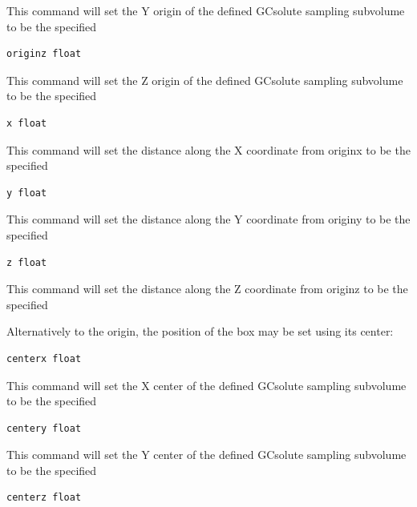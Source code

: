 \documentclass[letterpaper,10pt,english]{sphinxmanual}
\begin{document}
This command will set the Y origin of the defined GCsolute sampling subvolume to be the specified 

\begin{Verbatim}[commandchars=\\\{\}]
originz float
\end{Verbatim}

This command will set the Z origin of the defined GCsolute sampling subvolume to be the specified 

\begin{Verbatim}[commandchars=\\\{\}]
x float
\end{Verbatim}

This command will set the distance along the X coordinate from originx to be the specified 

\begin{Verbatim}[commandchars=\\\{\}]
y float
\end{Verbatim}

This command will set the distance along the Y coordinate from originy to be the specified 

\begin{Verbatim}[commandchars=\\\{\}]
z float
\end{Verbatim}

This command will set the distance along the Z coordinate from originz to be the specified 

Alternatively to the origin, the position of the box may be set using its center:

\begin{Verbatim}[commandchars=\\\{\}]
centerx float
\end{Verbatim}

This command will set the X center of the defined GCsolute sampling subvolume to be the specified 

\begin{Verbatim}[commandchars=\\\{\}]
centery float
\end{Verbatim}

This command will set the Y center of the defined GCsolute sampling subvolume to be the specified 

\begin{Verbatim}[commandchars=\\\{\}]
centerz float
\end{Verbatim}
\end{document}
